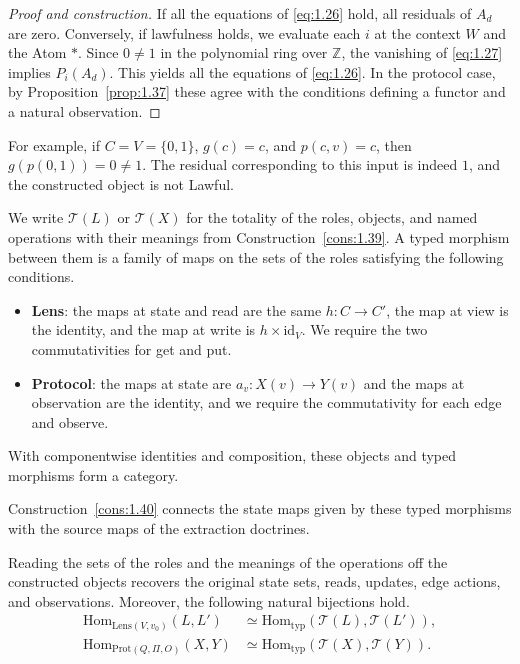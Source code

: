 \begin{proof}[Proof and construction]
If all the equations of \eqref{eq:1.26} hold, all residuals of $A_d$ are zero.
Conversely, if lawfulness holds, we evaluate each $i$ at the context $W$ and
the Atom $*$.
Since $0\ne1$ in the polynomial ring over $\mathbb{Z}$, the vanishing of
\eqref{eq:1.27} implies $P_i(A_d)$.
This yields all the equations of \eqref{eq:1.26}.
In the protocol case, by Proposition~\ref{prop:1.37} these agree with the
conditions defining a functor and a natural observation.

\end{proof}

For example, if $C=V=\{0,1\}$, $g(c)=c$, and $p(c,v)=c$, then
$g(p(0,1))=0\ne1$. The residual corresponding to this input is indeed $1$, and
the constructed object is not Lawful.

\begin{definition}\label{def:1.42}

We write $\mathcal{T}(L)$ or $\mathcal{T}(X)$ for the totality of the roles,
objects, and named operations with their meanings from
Construction~\ref{cons:1.39}.
A typed morphism between them is a family of maps on the sets of the roles
satisfying the following conditions.

\begin{itemize}
\item \textbf{Lens}: the maps at state and read are the same $h:C\to C'$, the
map at view is the identity, and the map at write is $h\times\mathrm{id}_V$.
We require the two commutativities for get and put.
\item \textbf{Protocol}: the maps at state are $a_v:X(v)\to Y(v)$ and the maps
at observation are the identity, and we require the commutativity for each
edge and observe.
\end{itemize}

With componentwise identities and composition, these objects and typed
morphisms form a category.

Construction~\ref{cons:1.40} connects the state maps given by these typed
morphisms with the source maps of the extraction doctrines.

\end{definition}

\begin{proposition}\label{prop:1.43}

Reading the sets of the roles and the meanings of the operations off the
constructed objects recovers the original state sets, reads, updates, edge
actions, and observations. Moreover, the following natural bijections hold.
\begin{equation*}
\begin{aligned}
\mathrm{Hom}_{\mathrm{Lens}(V,v_0)}(L,L')
&\simeq\mathrm{Hom}_{\mathrm{typ}}(\mathcal{T}(L),\mathcal{T}(L')),\\
\mathrm{Hom}_{\mathrm{Prot}(Q,\Pi,O)}(X,Y)
&\simeq\mathrm{Hom}_{\mathrm{typ}}(\mathcal{T}(X),\mathcal{T}(Y)).
\end{aligned}
\tag{1.28}\label{eq:1.28}
\end{equation*}

\end{proposition}

